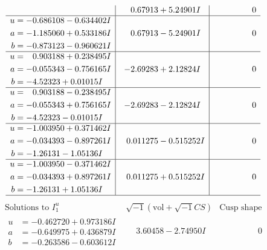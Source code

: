 \documentclass[1p]{elsarticle_modified}
\theoremstyle{definition}
\newcommand{\I}{\sqrt{-1}}
\begin{document}
$$\begin{array}{c|c|c}
 & \phantom{-}0.67913 + 5.24901 I & \phantom{-0.000000 } 0 \\ \hline\begin{aligned}
u &= -0.686108 - 0.634402 I \\
a &= -1.185060 + 0.533186 I \\
b &= -0.873123 - 0.960621 I\end{aligned}
 & \phantom{-}0.67913 - 5.24901 I & \phantom{-0.000000 } 0 \\ \hline\begin{aligned}
u &= \phantom{-}0.903188 + 0.238495 I \\
a &= -0.055343 - 0.756165 I \\
b &= -4.52323 + 0.01015 I\end{aligned}
 & -2.69283 + 2.12824 I & \phantom{-0.000000 } 0 \\ \hline\begin{aligned}
u &= \phantom{-}0.903188 - 0.238495 I \\
a &= -0.055343 + 0.756165 I \\
b &= -4.52323 - 0.01015 I\end{aligned}
 & -2.69283 - 2.12824 I & \phantom{-0.000000 } 0 \\ \hline\begin{aligned}
u &= -1.003950 + 0.371462 I \\
a &= -0.034393 - 0.897261 I \\
b &= -1.26131 - 1.05136 I\end{aligned}
 & \phantom{-}0.011275 - 0.515252 I & \phantom{-0.000000 } 0 \\ \hline\begin{aligned}
u &= -1.003950 - 0.371462 I \\
a &= -0.034393 + 0.897261 I \\
b &= -1.26131 + 1.05136 I\end{aligned}
 & \phantom{-}0.011275 + 0.515252 I & \phantom{-0.000000 } 0\\
 \hline 
 \end{array}$$\newpage$$\begin{array}{c|c|c}  
\text{Solutions to }I^u_{1}& \I (\text{vol} + \sqrt{-1}CS) & \text{Cusp shape}\\
 \hline 
\begin{aligned}
u &= -0.462720 + 0.973186 I \\
a &= -0.649975 + 0.436879 I \\
b &= -0.263586 - 0.603612 I\end{aligned}
 & \phantom{-}3.60458 - 2.74950 I & \phantom{-0.000000 } 0 \\ \hline\begin{aligned}

\end{aligned}
\end{array}$$
\end{document}
